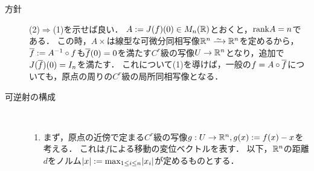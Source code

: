 \documentclass[uplatex,dvipdfmx]{jsreport}
\begin{document}
\begin{Proof}\mbox{}
    \begin{description}
        \item[方針] 
        (2)$\Rightarrow$(1)を示せば良い．
        $A:=J(f)(0)\in M_n(\mathbb{R})$とおくと，$\mathrm{rank} A=n$である．
        この時，$A\times$は線型な可微分同相写像$\R^n\iso\R^n$を定めるから，$\overline{f}:=A^{-1}\circ f$も$\overline{f}(0)=0$を満たす$C^r$級の写像$U\to\mathbb{R}^n$となり，追加で$J(\overline{f})(0)=I_n$を満たす．
        これについて(1)を導けば，一般の$f=A\circ\overline{f}$についても，原点の周りの$C^r$級の局所同相写像となる．
        \item[可逆射の構成] \mbox{}\\
        \begin{enumerate}
            \item まず，原点の近傍で定まる$C^r$級の写像$g:U\to\mathbb{R}^n,g(x):=f(x)-x$を考える．
            これは$f$による移動の変位ベクトルを表す．
            以下，$\mathbb{R}^n$の距離$d$をノルム$\lvert x\rvert:=\max_{1\le i\le n}\lvert x_i\rvert$が定めるものとする．


\end{enumerate}
\end{description}
\end{Proof}
\end{document}
